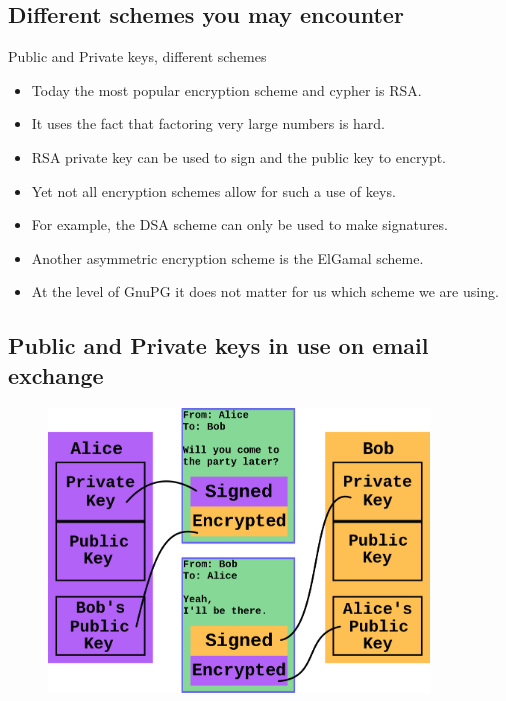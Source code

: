 \documentclass[hyperref={colorlinks=true}]{beamer}
\begin{document}
\subsection{Different schemes you may encounter}
\begin{frame}{Public and Private keys, different schemes}
  \begin{itemize}
    \item Today the most popular encryption scheme and cypher is RSA.
    \item It uses the fact that factoring very large numbers is hard.
    \item RSA private key can be used to sign and the public key to encrypt.
    \item Yet not all encryption schemes allow for such a use of keys.
    \item For example, the DSA scheme can only be used to make signatures.
    \item Another asymmetric encryption scheme is the ElGamal scheme.
    \item At the level of GnuPG it does not matter for us which scheme we are
using.
  \end{itemize}
\end{frame}

\subsection{Public and Private keys in use on email exchange}
\begin{frame}
  \begin{figure}
\includegraphics[width=0.9\textwidth]{encrypted-email-exchange.png}
  \end{figure}
\end{frame}
\end{document}

